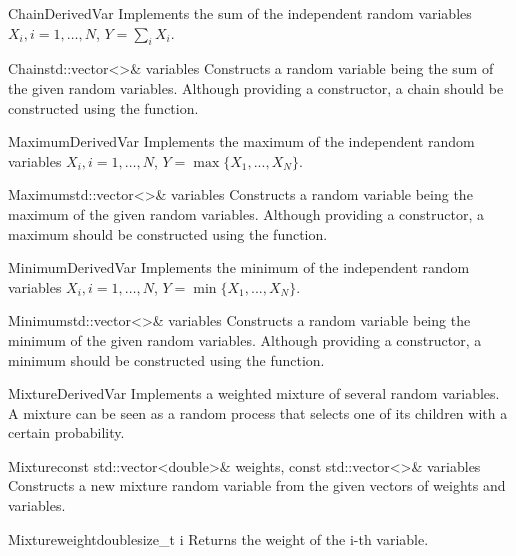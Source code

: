 \documentclass[a4paper, 10pt]{paper}
\begin{document}
\begin{defclassex}{Chain}{DerivedVar}
Implements the sum of the independent random variables $X_i, i=1,\dots,N$, $Y = \sum_i X_i$.

\begin{classsyn}{Chain}{std::vector<>\& variables}
Constructs a random variable being the sum of the given random variables. Although providing a constructor, a chain
should be constructed using the  function.
\end{classsyn}
\end{defclassex}

\begin{defclassex}{Maximum}{DerivedVar}
Implements the maximum of the independent random variables $X_i, i=1,\dots,N$, $Y = \max\{X_1,...,X_N\}$.

\begin{classsyn}{Maximum}{std::vector<>\& variables}
Constructs a random variable being the maximum of the given random variables. Although providing a constructor, a maximum
should be constructed using the  function.
\end{classsyn}
\end{defclassex}

\begin{defclassex}{Minimum}{DerivedVar}
Implements the minimum of the independent random variables $X_i, i=1,\dots,N$, $Y = \min\{X_1,...,X_N\}$.

\begin{classsyn}{Minimum}{std::vector<>\& variables}
Constructs a random variable being the minimum of the given random variables. Although providing a constructor, a minimum
should be constructed using the  function.
\end{classsyn}
\end{defclassex}

\begin{defclassex}{Mixture}{DerivedVar}
Implements a weighted mixture of several random variables. A mixture can be seen as a random process that selects one of
its children with a certain probability.

\begin{classsyn}{Mixture}{const std::vector<double>\& weights, const std::vector<>\& variables}
Constructs a new mixture random variable from the given vectors of weights and variables. 
\end{classsyn}

\begin{defmeth}{Mixture}{weight}{double}{size\_t i}
Returns the weight of the i-th variable.
\end{defmeth}
\end{defclassex}
\end{document}
